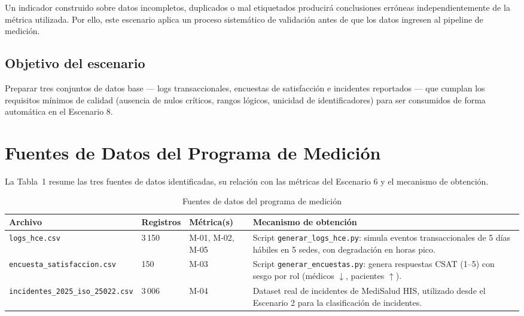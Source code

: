 \documentclass[12pt,a4paper]{article}
\begin{document}
Un indicador construido sobre datos incompletos, duplicados o mal etiquetados producir\'a conclusiones err\'oneas independientemente de la m\'etrica utilizada. Por ello, este escenario aplica un proceso sistem\'atico de validaci\'on antes de que los datos ingresen al pipeline de medici\'on.

\subsection{Objetivo del escenario}
Preparar tres conjuntos de datos base --- logs transaccionales, encuestas de satisfacci\'on e incidentes reportados --- que cumplan los requisitos m\'inimos de calidad (ausencia de nulos cr\'iticos, rangos l\'ogicos, unicidad de identificadores) para ser consumidos de forma autom\'atica en el Escenario 8.

\section{Fuentes de Datos del Programa de Medici\'on}

La Tabla~1 resume las tres fuentes de datos identificadas, su relaci\'on con las m\'etricas del Escenario 6 y el mecanismo de obtenci\'on.

\begin{table}[H]
\centering
\caption{Fuentes de datos del programa de medici\'on}
\begin{tabularx}{\textwidth}{l l l X}
\toprule
\textbf{Archivo} & \textbf{Registros} & \textbf{M\'etrica(s)} & \textbf{Mecanismo de obtenci\'on} \\
\midrule
\texttt{logs\_hce.csv} & 3\,150 & M-01, M-02, M-05 & Script \texttt{generar\_logs\_hce.py}: simula eventos transaccionales de 5 d\'ias h\'abiles en 5 sedes, con degradaci\'on en horas pico. \\
\texttt{encuesta\_satisfaccion.csv} & 150 & M-03 & Script \texttt{generar\_encuestas.py}: genera respuestas CSAT (1--5) con sesgo por rol (m\'edicos $\downarrow$, pacientes $\uparrow$). \\
\texttt{incidentes\_2025\_iso\_25022.csv} & 3\,006 & M-04 & Dataset real de incidentes de MediSalud HIS, utilizado desde el Escenario 2 para la clasificaci\'on de incidentes. \\
\bottomrule
\end{tabularx}
\end{table}

\end{document}

